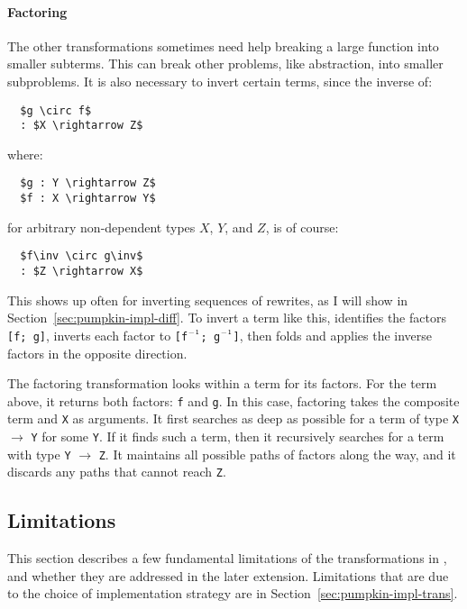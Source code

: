 \paragraph{Factoring} The other transformations sometimes need help breaking a large function into smaller subterms.
This can break other problems, like abstraction, into smaller subproblems.
It is also necessary to invert certain terms, since the inverse of:

\begin{lstlisting}
  $g \circ f$
  : $X \rightarrow Z$
\end{lstlisting}
where:

\begin{lstlisting}
  $g : Y \rightarrow Z$
  $f : X \rightarrow Y$
\end{lstlisting}
for arbitrary non-dependent types $X$, $Y$, and $Z$,
is of course:

\begin{lstlisting}
  $f\inv \circ g\inv$
  : $Z \rightarrow X$ 
\end{lstlisting}
This shows up often for inverting sequences of rewrites, as I will show in Section~\ref{sec:pumpkin-impl-diff}.
To invert a term like this, \sysname identifies the factors \lstinline{[f; g]}, 
inverts each factor to \lstinline{[f}$\inv$\lstinline{; g}$\inv$\lstinline{]}, 
then folds and applies the inverse factors in the opposite direction.

The factoring transformation looks within a term for its factors.
For the term above, it returns both factors: \lstinline{f} and \lstinline{g}.
In this case, factoring takes the composite term and \lstinline{X} as arguments.
It first searches as deep as possible for a term of type \lstinline{X} $\rightarrow$ \lstinline{Y} for some \lstinline{Y}.
If it finds such a term, then it recursively searches for a term with type \lstinline{Y} $\rightarrow$ \lstinline{Z}. 
It maintains all possible 
paths of factors along the way, and it discards any paths that cannot reach \lstinline{Z}.

\subsection{Limitations}
\label{sec:pumpkin-trans-limitations}

This section describes a few fundamental limitations of the transformations in \sysname,
and whether they are addressed in the later \toolnamec extension.
Limitations that are due to the choice of implementation strategy are in Section~\ref{sec:pumpkin-impl-trans}.

